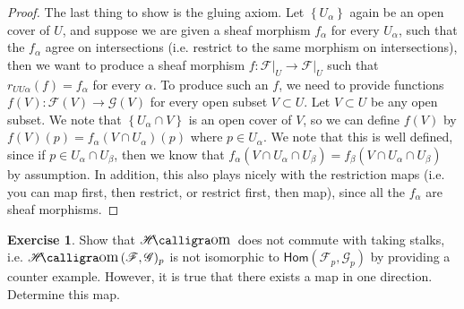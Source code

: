 \documentclass[psamsfonts]{amsart}
\theoremstyle{definition}
\newtheorem{exer}[thm]{Exercise}
\theoremstyle{remark}
\renewcommand{\hom}{\mathsf{Hom}}
\newcommand{\set}[1]{\left\lbrace #1 \right\rbrace}
\DeclareMathOperator{\sheafhom}{\mathscr{H}\text{\kern -3pt {\calligra\large om}}\,}
\begin{document}
\begin{proof}
The last thing to show is the gluing axiom. Let $\set{U_\alpha}$ again be an open cover of $U$, and suppose we are given a sheaf morphism $f_\alpha$ for every $U_\alpha$, such that the $f_\alpha$ agree on intersections (i.e. restrict to the same morphism on intersections), then we want to produce a sheaf morphism $f : \mathscr{F}\vert_U \to \mathscr{F}\vert_U$ such that $r_{UU\alpha}(f) = f_\alpha$ for every $\alpha$. To produce such an $f$, we need to provide functions $f(V) : \mathscr{F}(V) \to \mathscr{G}(V)$ for every open subset $V \subset U$. Let $V \subset U$ be any open subset. We note that $\set{U_\alpha \cap V}$ is an open cover of $V$, so we can define $f(V)$ by $f(V)(p) = f_\alpha(V \cap U_\alpha)(p)$ where $p \in U_\alpha$. We note that this is well defined, since if $p \in U_\alpha \cap U_\beta$, then we know that $f_\alpha(V \cap U_\alpha \cap U_\beta) = f_\beta(V \cap U_\alpha \cap U_\beta)$ by assumption. In addition, this also plays nicely with the restriction maps (i.e. you can map first, then restrict, or restrict first, then map), since all the $f_\alpha$ are sheaf morphisms.
\end{proof}
%
\begin{exer}
Show that $\sheafhom$ does not commute with taking stalks, i.e. $\sheafhom(\mathscr{F}, \mathscr{G})_p$ is not isomorphic to $\hom(\mathscr{F}_p, \mathscr{G}_p)$ by providing a counter example. However, it is true that there exists a map in one direction. Determine this map.
\end{exer}
%
\end{document}
